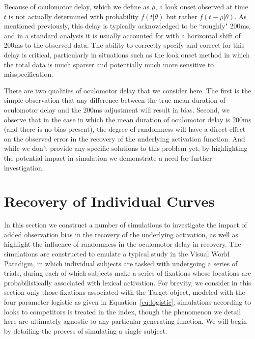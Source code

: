 Because of oculomotor delay, which we define as $\rho$, a look onset observed at time $t$ is not actually determined with probability $f(t|\theta)$ but rather $f(t - \rho|\theta)$. As mentioned previously, this delay is typically acknowledged to be ``roughly" 200ms, and in a standard analysis it is usually accounted for with a horizontal shift of 200ms to the observed data. The ability to correctly specify and correct for this delay is critical, particularly in situations such as the look onset method in which the total data is much sparser and potentially much more sensitive to misspecification. 

There are two qualities of oculomotor delay that we consider here. The first is the simple observation that any difference between the true mean duration of oculomotor delay and the 200ms adjustment will result in bias. Second, we observe that in the case in which the mean duration of oculomotor delay is 200ms (and there is no bias present), the degree of randomness will have a direct effect on the observed error in the recovery of the underlying activation function. And while we don't provide any specific solutions to this problem yet, by highlighting the potential impact in simulation we demonstrate a need for further investigation.




\section{Recovery of Individual Curves}\label{sec:ind_curves}


In this section we construct a number of simulations to investigate the impact of added observation bias in the recovery of the underlying activation, as well as highlight the influence of randomness in the oculomotor delay in recovery. The simulations are constructed to emulate a typical study in the Visual World Paradigm, in which individual subjects are tasked with undergoing a series of trials, during each of which subjects make a series of fixations whose locations are probabilistically associated with lexical activation. For brevity, we consider in this section only those fixations associated with the Target object, modeled with the four parameter logistic as given in Equation~\ref{eq:logistic}; simulations according to looks to competitors is treated in the index, though the phenomenon we detail here are ultimately agnostic to any particular generating function. We will begin by detailing the process of simulating a single subject. 


